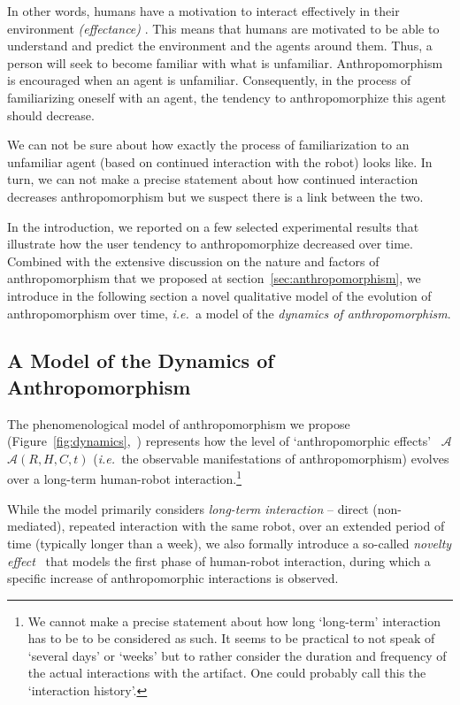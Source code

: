 \documentclass{frontiersSCNS} %
\newcommand{\ie}{{\textit{i.e.~}}}
\newcommand{\Ant}[1][]{%
      \ifthenelse{\isempty{#1}}%
        {$\mathcal{A}$}
        {$\mathcal{A}(#1)$}
}
\begin{document}
In other words, humans have a motivation to interact
effectively in their environment \textit{(effectance)} \citep{epley_when_2008}.
This means that humans are motivated to be able to understand and predict the
environment and the agents around them. Thus, a person will seek to become familiar with what is unfamiliar. Anthropomorphism is encouraged when an agent is unfamiliar. Consequently, in the process of familiarizing oneself with an agent, the tendency to anthropomorphize this agent should decrease.

We can not be sure about how exactly the process of familiarization to an unfamiliar agent (based on continued interaction with the robot) looks like. In turn, we can not make a precise statement about how continued interaction decreases anthropomorphism but we suspect there is a link between the two.

In the introduction, we reported on a few selected experimental results that
illustrate how the user tendency to anthropomorphize decreased over time.
Combined with the extensive discussion on the nature and factors of
anthropomorphism that we proposed at section~\ref{sec:anthropomorphism}, we
introduce in the following section a novel qualitative model of the evolution
of anthropomorphism over time, \ie a model of the \emph{dynamics of anthropomorphism}.


\subsection{A Model of the Dynamics of Anthropomorphism}
\label{sec:dynamics-model}

The phenomenological model of anthropomorphism we propose
(Figure~\ref{fig:dynamics},~\citep{lemaignan2014dynamics}) represents how the
level of `anthropomorphic effects'~\Ant[R,H,C,t] (\ie the observable
manifestations of anthropomorphism) evolves over a long-term human-robot
interaction.\footnote{We cannot make a precise statement about how long `long-term' interaction has to be to be considered as such. It seems to be practical to not speak of `several days' or `weeks' but to rather consider the duration and frequency of the actual interactions with the artifact. One could probably call this the `interaction history'.}

While the model primarily considers \emph{long-term interaction} -- direct
(non-mediated), repeated interaction with the same robot, over an extended
period of time (typically longer than a week), we also formally introduce a
so-called \emph{novelty effect}~\citep{kanda_interactive_2004} that models the
first phase of human-robot interaction, during which a specific increase of
anthropomorphic interactions is observed.
\end{document}
